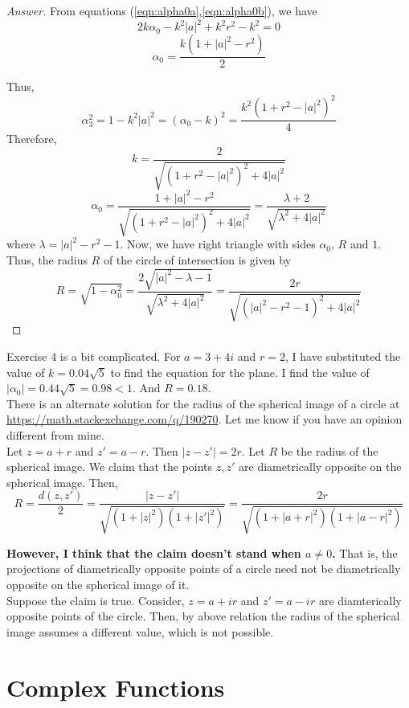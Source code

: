 \begin{enumerate}
\begin{proof}[Answer]
		From equations (\ref{eqn:alpha0a},\ref{eqn:alpha0b}), we have
		\[ 2k\alpha_0-k^2|a|^2+k^2r^2-k^2 = 0 \]
		\[ \alpha_0 = \frac{k(1+|a|^2-r^2)}{2} \]

		Thus,
		\[ \alpha_3^2 = 1-k^2|a|^2 = (\alpha_0-k)^2 = \frac{k^2(1+r^2-|a|^2)^2}{4} \]
		Therefore,
		\[ k = \frac{2}{\sqrt{(1+r^2-|a|^2)^2+4|a|^2}} \]
		\[ \alpha_0 = \frac{1+|a|^2-r^2}{\sqrt{(1+r^2-|a|^2)^2+4|a|^2}} = \frac{\lambda+2}{\sqrt{\lambda^2+4|a|^2}} \]
		where $\lambda = |a|^2-r^2-1$.
		Now, we have right triangle with sides $\alpha_0$, $R$ and $1$.
		Thus, the radius $R$ of the circle of intersection is given by 
		\[ R = \sqrt{1-\alpha_0^2} = \frac{2\sqrt{|a|^2-\lambda-1}}{\sqrt{\lambda^2+4|a|^2}} = \frac{2r}{\sqrt{(|a|^2-r^2-1)^2+4|a|^2}} \]
	\end{proof}
\begin{commentary}
	Exercise 4 is a bit complicated.
	For $a = 3+4i$ and $r = 2$, I have substituted the value of $k = 0.04\sqrt{5}$ to find the equation for the plane.
	I find the value of $|\alpha_0| = 0.44\sqrt{5} = 0.98 < 1$.
	And $R = 0.18$. \\

	There is an alternate solution for the radius of the spherical image of a circle at \url{https://math.stackexchange.com/q/190270}.
	Let me know if you have an opinion different from mine.\\

	Let $z = a+r$ and $z' = a-r$.
	Then $|z-z'| = 2r$.
	Let $R$ be the radius of the spherical image.
	We claim that the points $z,z'$ are diametrically opposite on the spherical image.
	Then,
	\[ R = \frac{d(z,z')}{2} = \frac{|z-z'|}{\sqrt{(1+|z|^2)(1+|{z'}|^2)}} = \frac{2r}{\sqrt{(1+|a+r|^2)(1+|a-r|^2)}} \]

	\textbf{However, I think that the claim doesn't stand when $a \ne 0$.}
	That is, the projections of diametrically opposite points of a circle need not be diametrically opposite on the spherical image of it.\\

	Suppose the claim is true.
	Consider, $z = a+ir$ and $z'=a-ir$ are diamterically opposite points of the circle.
	Then, by above relation the radius of the spherical image assumes a different value, which is not possible.
	\end{commentary}
\end{enumerate}

\section{Complex Functions}
